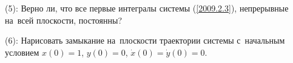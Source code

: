 \documentclass[a4paper]{article}
\newcommand{\skill}[1]{\textsf{(#1):}}
\begin{document}
\begin{problem}
\skill{5} Верно ли, что все первые интегралы системы (\ref{2009.2.3}), непрерывные на~всей плоскости, постоянны?
\end{problem}

\begin{problem}
\skill{6} Нарисовать замыкание на~плоскости траектории системы 
с~начальным условием $x(0)=1$, $y(0)=0$, $\dot x(0)=\dot y(0)=0$.
\end{problem}

\medskip\dmvntrail
\end{document}
